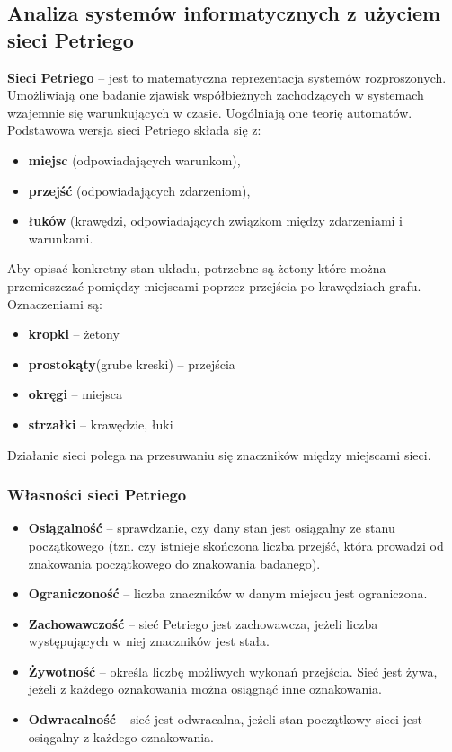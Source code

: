 \subsection{Analiza systemów informatycznych z użyciem sieci Petriego}

\textbf{Sieci Petriego} – jest to matematyczna reprezentacja systemów rozproszonych. Umożliwiają one badanie zjawisk współbieżnych zachodzących w systemach wzajemnie się warunkujących w czasie. Uogólniają one teorię automatów. Podstawowa wersja sieci Petriego składa się z:


\begin{itemize}
	\item \textbf{miejsc} (odpowiadających warunkom),
	\item \textbf{przejść} (odpowiadających zdarzeniom),
	\item \textbf{łuków} (krawędzi, odpowiadających związkom między zdarzeniami i warunkami.
\end{itemize}

Aby opisać konkretny stan układu, potrzebne są żetony które można przemieszczać pomiędzy miejscami poprzez przejścia po krawędziach grafu. Oznaczeniami są:


\begin{itemize}
	\item \textbf{kropki} – żetony
	\item \textbf{prostokąty}(grube kreski) – przejścia
	\item \textbf{okręgi} – miejsca
	\item \textbf{strzałki} – krawędzie, łuki

\end{itemize}

Działanie sieci polega na przesuwaniu się znaczników między miejscami sieci.

\subsubsection{Własności sieci Petriego}

\begin{itemize}
	\item \textbf{Osiągalność} – sprawdzanie, czy dany stan jest osiągalny ze stanu początkowego (tzn. czy istnieje skończona liczba przejść, która prowadzi od znakowania początkowego do znakowania badanego).
	\item \textbf{Ograniczoność} – liczba znaczników w danym miejscu jest ograniczona.
	\item \textbf{Zachowawczość} – sieć Petriego jest zachowawcza, jeżeli liczba występujących w niej znaczników jest stała.
	\item \textbf{Żywotność} – określa liczbę możliwych wykonań przejścia. Sieć jest żywa, jeżeli z każdego oznakowania można osiągnąć inne oznakowania.
	\item \textbf{Odwracalność} – sieć jest odwracalna, jeżeli stan początkowy sieci jest osiągalny z każdego oznakowania.
\end{itemize}

